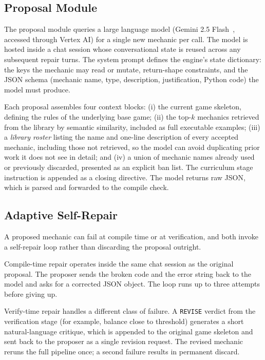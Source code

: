 \documentclass[conference]{IEEEtran}
\begin{document}
\subsection{Proposal Module}
The proposal module queries a large language model (Gemini 2.5 Flash~\cite{geminiteam2024gemini15}, accessed
   through Vertex AI) for a single new mechanic per call. The model is hosted 
  inside a chat session whose conversational state is reused across any         
  subsequent repair turns. The system prompt defines the engine's state         
  dictionary: the keys the mechanic may read or mutate, return-shape
  constraints, and the JSON schema (mechanic name, type, description,           
  justification, Python code) the model must produce.                         
                                                                                
  Each proposal assembles four context blocks: (i) the current game skeleton, 
  defining the rules of the underlying base game; (ii) the top-$k$ mechanics    
  retrieved from the library by semantic similarity, included as full executable
   examples; (iii) a \emph{library roster} listing the name and one-line        
  description of every accepted mechanic, including those not retrieved, so the
  model can avoid duplicating prior work it does not see in detail; and (iv) a
  union of mechanic names already used or previously discarded, presented as an
  explicit ban list. The curriculum stage instruction is appended as a closing
  directive. The model returns raw JSON, which is parsed and forwarded to the   
  compile check.

\subsection{Adaptive Self-Repair}                                           
                                                                                
A proposed mechanic can fail at compile time or at verification, and both invoke a self-repair loop rather than discarding the proposal outright.

Compile-time repair operates inside the same chat session as the original proposal. The proposer sends the broken code and the error string back to the model and asks for a corrected JSON object. The loop runs up to three attempts before giving up.

Verify-time repair handles a different class of failure. A \texttt{REVISE} verdict from the verification stage (for example, balance close to threshold) generates a short natural-language critique, which is appended to the original game skeleton and sent back to the proposer as a single revision request. The revised mechanic reruns the full pipeline once; a second failure results in permanent discard.
\end{document}
